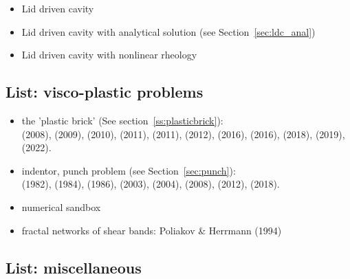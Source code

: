 \begin{itemize}
\item Lid driven cavity 
      \cite{kawa61,chor67,shry78,foth79,ghgs82,kost84,bope98,xika01,brsa06,ertu09,tesk12}

\item Lid driven cavity with analytical solution (see Section~\ref{sec:ldc_anal})

\item Lid driven cavity with nonlinear rheology \cite{been80,svna18}
\end{itemize}

\subsection{List: visco-plastic problems}

\begin{itemize}

\item the 'plastic brick' (See section~\ref{ss:plasticbrick}): \\
      \textcite{lemm08} (2008), 
      \textcite{qurj09} (2009), 
      \textcite{kaus10} (2010), 
      \textcite{mishin11} (2011), 
      \textcite{muso11} (2011), 
      \textcite{maie12} (2012), 
      \textcite{spmw16} (2016), 
      \textcite{kapb16} (2016), 
      \textcite{gltf18} (2018), 
      \textcite{frbt19} (2019),
      \textcite{mivg22} (2022).

\item indentor, punch problem (see Section~\ref{sec:punch}):\\
      \textcite{vidm82} (1982),
      \textcite{vidm84} (1984),
      \textcite{vimd86} (1986),
      \textcite{hukm03} (2003), 
      \textcite{fojd04} (2004), 
      \textcite{thfb08} (2008),
      \textcite{gerb12} (2012), 
      \textcite{gltf18} (2018).

\item numerical sandbox \cite{bube06,bube06,maie12,busa16,gltf18}
\item fractal networks of  shear bands: Poliakov \& Herrmann (1994) \cite{pohe94}
\end{itemize}


\subsection{List: miscellaneous}

